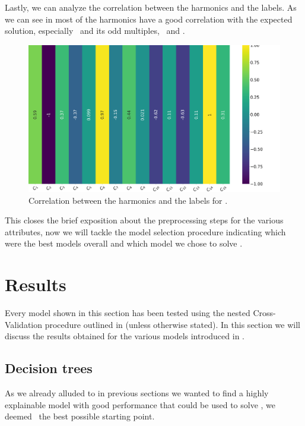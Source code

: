 Lastly, we can analyze the correlation between the harmonics and the labels. As we can see in
 most of the harmonics have a good correlation with the expected solution,
especially \phin[2]\ and its odd multiples, \phin[1]\ and \phin[12].
\begin{figure}[!ht]
	\centering
	\includegraphics[width=0.7\linewidth]{img/Phi_label_corr.png}
	\caption{Correlation between the harmonics and the labels for \phin.} \label{fig:phi-lcorr}
\end{figure}

\medskip

This closes the brief exposition about the preprocessing steps for the various attributes, now we will
tackle the model selection procedure indicating which were the best models overall and which model
we chose to solve \qrp.

\section{Results}
\label{sec:results-qrp}
Every model shown in this section has been tested using the nested Cross-Validation procedure
outlined in  (unless otherwise stated). In this section we will discuss the results obtained for the various models
introduced in .

\subsection{Decision trees}
\label{sec:qrp-dt}
As we already alluded to in previous sections we wanted to find a highly explainable model with good
performance that could be used to solve \qrp, we deemed \dts\ the best possible starting point.

